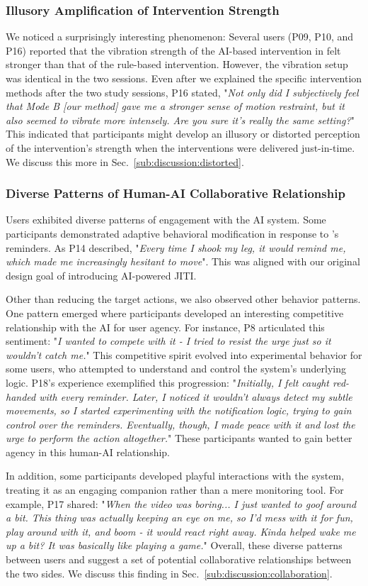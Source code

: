 \subsubsection{Illusory Amplification of Intervention Strength}
We noticed a surprisingly interesting phenomenon: 
Several users (P09, P10, and P16) reported that the vibration strength of the AI-based intervention in \projectname felt stronger than that of the rule-based intervention. However, the vibration setup was identical in the two sessions.
Even after we explained the specific intervention methods after the two study sessions, P16 stated, "\textit{Not only did I subjectively feel that Mode B [our \projectname method] gave me a stronger sense of motion restraint, but it also seemed to vibrate more intensely. Are you sure it's really the same setting?}"
This indicated that participants might develop an illusory or distorted perception of the intervention's strength when the interventions were delivered just-in-time.
We discuss this more in Sec.~\ref{sub:discussion:distorted}.

\subsubsection{Diverse Patterns of Human-AI Collaborative Relationship}
Users exhibited diverse patterns of engagement with the AI system. Some participants demonstrated adaptive behavioral modification in response to \projectname's reminders. As P14 described, "\textit{Every time I shook my leg, it would remind me, which made me increasingly hesitant to move}". This was aligned with our original design goal of introducing AI-powered JITI.

Other than reducing the target actions, we also observed other behavior patterns. One pattern emerged where participants developed an interesting competitive relationship with the AI for user agency. For instance, P8 articulated this sentiment: "\textit{I wanted to compete with it - I tried to resist the urge just so it wouldn't catch me.}" This competitive spirit evolved into experimental behavior for some users, who attempted to understand and control the system's underlying logic. P18's experience exemplified this progression: "\textit{Initially, I felt caught red-handed with every reminder. Later, I noticed it wouldn't always detect my subtle movements, so I started experimenting with the notification logic, trying to gain control over the reminders. Eventually, though, I made peace with it and lost the urge to perform the action altogether.}" These participants wanted to gain better agency in this human-AI relationship.

In addition, some participants developed playful interactions with the system, treating it as an engaging companion rather than a mere monitoring tool. For example, P17 shared: "\textit{When the video was boring... I just wanted to goof around a bit. This thing was actually keeping an eye on me, so I'd mess with it for fun, play around with it, and boom - it would react right away. Kinda helped wake me up a bit? It was basically like playing a game.}"
Overall, these diverse patterns between users and \projectname suggest a set of potential collaborative relationships between the two sides. We discuss this finding in Sec.~\ref{sub:discussion:collaboration}.